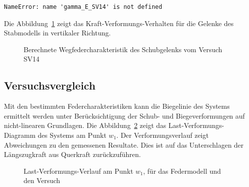 \documentclass[
  11pt,
  letterpaper,
]{scrreprt}
\begin{document}
\begin{verbatim}
NameError: name 'gamma_E_SV14' is not defined
\end{verbatim}

Die Abbildung~\ref{fig-wegfeder-schub-sv14} zeigt das
Kraft-Verformungs-Verhalten für die Gelenke des Stabmodells in
vertikaler Richtung.

\begin{figure}[H]


\caption{\label{fig-wegfeder-schub-sv14}Berechnete
Wegfedercharakteristik des Schubgelenks vom Versuch SV14}

\end{figure}%

\subsection{Versuchsvergleich}\label{versuchsvergleich-1}

Mit den bestimmten Federcharakteristiken kann die Biegelinie des Systems
ermittelt werden unter Berücksichtigung der Schub- und Biegeverformungen
auf nicht-linearen Grundlagen. Die Abbildung~\ref{fig-l-w-sv14} zeigt
das Last-Verformungs-Diagramm des Systems am Punkt \(w_1\). Der
Verformungsverlauf zeigt Abweichungen zu den gemessenen Resultate. Dies
ist auf das Unterschlagen der Längszugkraft aus Querkraft
zurückzuführen.

\begin{figure}[H]


\caption{\label{fig-l-w-sv14}Last-Verformungs-Verlauf am Punkt \(w_1\),
für das Federmodell und den Versuch}

\end{figure}%
\end{document}
